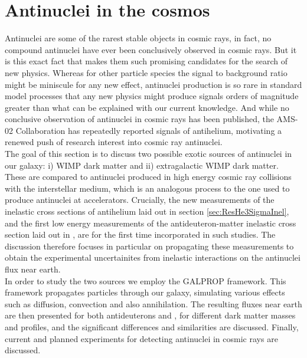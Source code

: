 \section{Antinuclei in the cosmos}
Antinuclei are some of the rarest stable objects in cosmic rays, in fact, no compound antinuclei have ever been conclusively observed in cosmic rays. But it is this exact fact that makes them such promising candidates for the search of new physics. Whereas for other particle species the signal to background ratio might be miniscule for any new effect, antinuclei production is so rare in standard model processes that any new physics might produce signals orders of magnitude greater than what can be explained with our current knowledge. And while no conclusive observation of antinuclei in cosmic rays has been published, the AMS-02 Collaboration has repeatedly reported signals of antihelium\cite{}, motivating a renewed push of research interest into cosmic ray antinuclei. \\
The goal of this section is to discuss two possible exotic sources of antinuclei in our galaxy: i) WIMP dark matter and ii) extragalactic WIMP dark matter. These are compared to antinuclei produced in high energy cosmic ray collisions with the interstellar medium, which is an analogous process to the one used to produce antinuclei at accelerators. Crucially, the new measurements of the inelastic cross sections of antihelium laid out in section \ref{sec:ResHe3SigmaInel}, and the first low energy measurements of the antideuteron-matter inelastic cross section laid out in \cite{antideuteronXS}, are for the first time incorporated in such studies. The discussion therefore focuses in particular on propagating these measurements to obtain the experimental uncertainites from inelastic interactions on the antinuclei flux near earth.\\
In order to study the two sources we employ the GALPROP framework. This framework propagates particles through our galaxy, simulating various effects such as diffusion, convection and also annihilation. The resulting fluxes near earth are then presented for both antideuterons and \ahe, for different dark matter masses and profiles, and the significant differences and similarities are discussed. Finally, current and planned experiments for detecting antinuclei in cosmic rays are discussed. 

